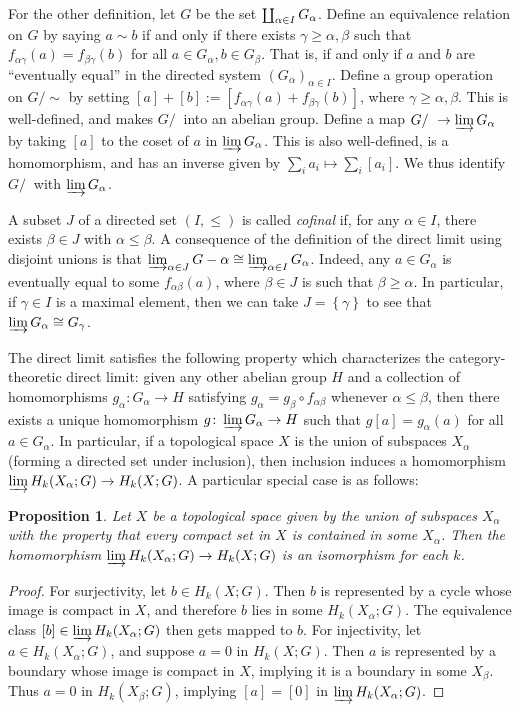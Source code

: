 \documentclass{book}
\newcommand{\set}[1]{\left\{ {#1} \right\}}
\DeclareRobustCommand{\coprod}{\mathop{\text{\fakecoprod}}}
\newcommand{\fakecoprod}{%
  \sbox0{$\prod$}%
  \smash{\raisebox{\dimexpr.9625\depth-\dp0}{\scalebox{1}[-1]{$\prod$}}}%
  \vphantom{$\prod$}%
}
\newtheorem{proposition}[theorem]{Proposition}
\theoremstyle{definition}
\theoremstyle{remark}
\numberwithin{equation}{section}
\begin{document}
For the other definition, let $G$ be the set $\coprod_{\alpha \in I} G_\alpha$. Define an equivalence relation on $G$ by saying $a \sim b$ if and only if there exists $\gamma \geq \alpha,\beta$ such that $f_{\alpha\gamma}(a) = f_{\beta\gamma}(b)$ for all $a \in G_\alpha, b \in G_\beta$. That is, if and only if $a$ and $b$ are ``eventually equal'' in the directed system $(G_\alpha)_{\alpha \in I}$. Define a group operation on $G/\sim$ by setting $[a] + [b] := [f_{\alpha\gamma}(a) + f_{\beta\gamma}(b)]$, where $\gamma \geq \alpha,\beta$. This is well-defined, and makes $G/~$ into an abelian group. Define a map $G/~ \to \varinjlim G_\alpha$ by taking $[a]$ to the coset of $a$ in $\varinjlim G_\alpha$. This is also well-defined, is a homomorphism, and has an inverse given by $\sum_i a_i \mapsto \sum_i [a_i]$. We thus identify $G/~$ with $\varinjlim G_\alpha$.

A subset $J$ of a directed set $(I,\leq)$ is called \textit{cofinal} if, for any $\alpha \in I$, there exists $\beta \in J$ with $\alpha \leq \beta$. A consequence of the definition of the direct limit using disjoint unions is that $\varinjlim_{\alpha \in J} G-\alpha \cong \varinjlim_{\alpha \in I} G_\alpha$. Indeed, any $a \in G_\alpha$ is eventually equal to some $f_{\alpha\beta}(a)$, where $\beta \in J$ is such that $\beta \geq \alpha$. In particular, if $\gamma \in I$ is a maximal element, then we can take $J = \set{\gamma}$ to see that $\varinjlim G_\alpha \cong G_\gamma$.

The direct limit satisfies the following property which characterizes the category-theoretic direct limit: given any other abelian group $H$ and a collection of homomorphisms $g_\alpha \colon G_\alpha \to H$ satisfying $g_\alpha = g_\beta \circ f_{\alpha\beta}$ whenever $\alpha \leq \beta$, then there exists a unique homomorphism $g \colon \varinjlim G_\alpha \to H$ such that $g[a] = g_\alpha(a)$ for all $a \in G_\alpha$. In particular, if a topological space $X$ is the union of subspaces $X_\alpha$ (forming a directed set under inclusion), then inclusion induces a homomorphism $\varinjlim H_k(X_\alpha;G) \to H_k(X;G)$. A particular special case is as follows:
\begin{proposition}
    Let $X$ be a topological space given by the union of subspaces $X_\alpha$ with the property that every compact set in $X$ is contained in some $X_\alpha$. Then the homomorphism $\varinjlim H_k(X_\alpha;G) \to H_k(X;G)$ is an isomorphism for each $k$.
\end{proposition}
\begin{proof}
    For surjectivity, let $b \in H_k(X;G)$. Then $b$ is represented by a cycle whose image is compact in $X$, and therefore $b$ lies in some $H_k(X_\alpha;G)$. The equivalence class $[b] \in \varinjlim H_k(X_\alpha;G)$ then gets mapped to $b$. For injectivity, let $a \in H_k(X_\alpha;G)$, and suppose $a = 0$ in $H_k(X;G)$. Then $a$ is represented by a boundary whose image is compact in $X$, implying it is a boundary in some $X_\beta$. Thus $a = 0$ in $H_k(X_\beta;G)$, implying $[a] = [0]$ in $\varinjlim H_k(X_\alpha;G)$.
\end{proof}
\end{document}
